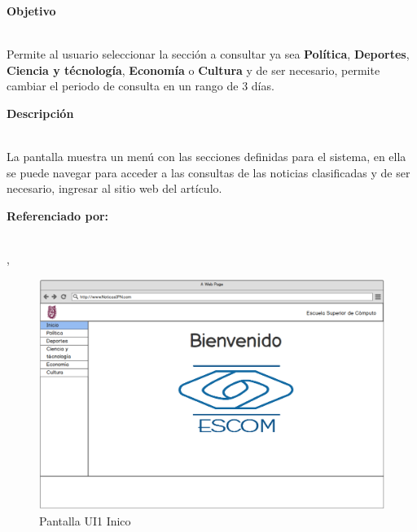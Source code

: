 
\begin{large}
  \textbf{Objetivo}\\\\
\end{large}


Permite al usuario seleccionar la  sección a consultar ya sea \textbf{Política}, \textbf{Deportes}, \textbf{Ciencia y técnología}, \textbf{Economía}
o \textbf{Cultura} y de ser necesario, permite cambiar el periodo de consulta en un rango de 3 días.\\

	

\begin{large}
  \textbf{Descripción}\\\\
\end{large}

La pantalla muestra un menú con las secciones definidas para el sistema, en ella se puede navegar para acceder a las consultas de las noticias clasificadas y de ser necesario, ingresar al sitio web del artículo.\\

%


\begin{large}
  \textbf{Referenciado por:}\\\\
\end{large}
\normalsize{,}
\begin{figure}[H]
  \centering
	\includegraphics[scale=.35]{imagenes/Pantallas/UI1}
  \caption{Pantalla UI1 Inico}
  \label{fig:UI1}
\end{figure}


